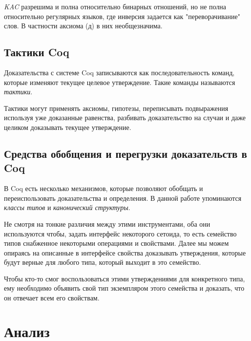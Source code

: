 \documentclass[times
              ]{itmo-student-thesis}
\begin{document}
    \textit{KAC} разрешима и полна относительно бинарных отношений, но не полна относительно регулярных языков, где инверсия задается как "переворачивание" слов.
    В частности аксиома (д) в них необщезначима.

  \subsection{Тактики Coq}
    Доказательства с системе Coq записываются как последовательность команд, которые изменяют текущее целевое утверждение. Такие команды называются \textit{тактики}.

    Тактики могут применять аксиомы, гипотезы, переписывать подвыражения используя уже доказанные равенства, разбивать доказательство на случаи и даже целиком доказывать текущее утверждение.

  \subsection{Средства обобщения и перегрузки доказательств в Coq}

    В Coq есть несколько механизмов, которые позволяют обобщать и переиспользовать доказательства и определения.
    В данной работе упоминаются \textit{классы типов} и \textit{канонический структуры}.

    Не смотря на тонкие различия между этими инструментами, оба они используются чтобы, задать интерфейс некоторого сетоида, то есть семейство типов снабженное некоторыми операциями и свойствами.
    Далее мы можем опираясь на описанные в интерфейсе свойства доказывать утверждения, которые будут верные для любого типа, который выходит в это семейство.

    Чтобы кто-то смог воспользоваться этими утверждениями для конкретного типа, ему необходимо объявить свой тип экземпляром этого семейства и доказать, что он отвечает всем его свойствам.


  \section{Анализ}
\end{document}
